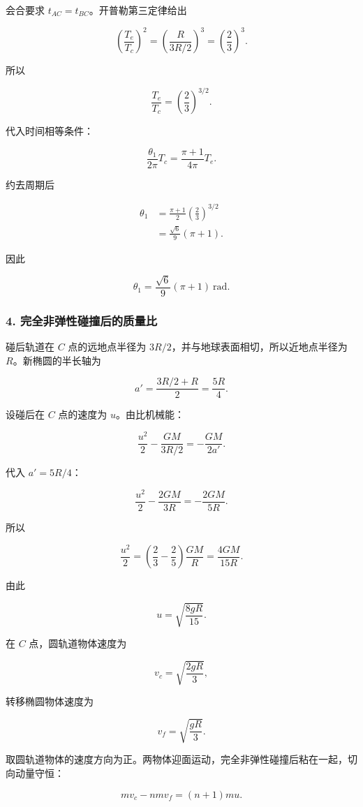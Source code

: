 \documentclass[12pt,a4paper,UTF8]{ctexart}
\begin{document}
会合要求 \(t_{AC}=t_{BC}\)。开普勒第三定律给出

\[
\left(\frac{T_e}{T_c}\right)^2
=\left(\frac{R}{3R/2}\right)^3
=\left(\frac23\right)^3.
\]

所以

\[
\frac{T_e}{T_c}=\left(\frac23\right)^{3/2}.
\]

代入时间相等条件：

\[
\frac{\theta_1}{2\pi}T_c
=\frac{\pi+1}{4\pi}T_e.
\]

约去周期后

\[
\begin{aligned}
\theta_1
&=\frac{\pi+1}{2}\left(\frac23\right)^{3/2}\\
&=\frac{\sqrt6}{9}(\pi+1).
\end{aligned}
\]

因此

\[
\boxed{\theta_1=\frac{\sqrt6}{9}(\pi+1)\ \mathrm{rad}}.
\]

\subsubsection{4.
完全非弹性碰撞后的质量比}\label{ux5b8cux5168ux975eux5f39ux6027ux78b0ux649eux540eux7684ux8d28ux91cfux6bd4}

碰后轨道在 \(C\) 点的远地点半径为
\(3R/2\)，并与地球表面相切，所以近地点半径为 \(R\)。新椭圆的半长轴为

\[
a'=\frac{3R/2+R}{2}=\frac{5R}{4}.
\]

设碰后在 \(C\) 点的速度为 \(u\)。由比机械能：

\[
\frac{u^2}{2}-\frac{GM}{3R/2}
=-\frac{GM}{2a'}.
\]

代入 \(a'=5R/4\)：

\[
\frac{u^2}{2}-\frac{2GM}{3R}
=-\frac{2GM}{5R}.
\]

所以

\[
\frac{u^2}{2}
=\left(\frac23-\frac25\right)\frac{GM}{R}
=\frac{4GM}{15R}.
\]

由此

\[
\boxed{u=\sqrt{\frac{8gR}{15}}}.
\]

在 \(C\) 点，圆轨道物体速度为

\[
v_c=\sqrt{\frac{2gR}{3}},
\]

转移椭圆物体速度为

\[
v_f=\sqrt{\frac{gR}{3}}.
\]

取圆轨道物体的速度方向为正。两物体迎面运动，完全非弹性碰撞后粘在一起，切向动量守恒：

\[
mv_c-nm v_f=(n+1)m u.
\]
\end{document}
